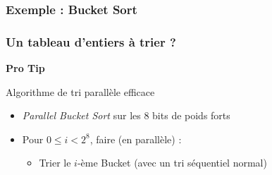 \documentclass[xcolor={x11names,svgnames},x11names,svgnames]{beamer}
\begin{document}
  
  
\begin{frame}[label=radix_curve]
  \frametitle{Exemple : Bucket Sort}

\end{frame}


\begin{frame}[label=radix_code]
  \frametitle{Un tableau d'entiers à trier ?}
  
    \begin{center}
      \Huge \bf \alert{Pro Tip}
  \end{center}

  \begin{exampleblock}{Algorithme de tri parallèle efficace}
    \begin{itemize}
  \item \emph{Parallel Bucket Sort} sur les 8 bits de poids forts
  \item Pour $0 \leq i < 2^8$, faire (en parallèle) :
    \begin{itemize}
    \item Trier le $i$-ème Bucket (avec un tri séquentiel normal)
    \end{itemize}
  \end{itemize}
\end{exampleblock}
  
\end{frame}
\end{document}
